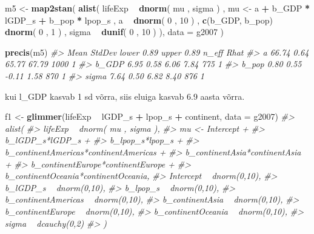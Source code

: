 \documentclass[]{book}
\newenvironment{Shaded}{\begin{snugshade}}{\end{snugshade}}
\newcommand{\KeywordTok}[1]{\textcolor[rgb]{0.13,0.29,0.53}{\textbf{#1}}}
\newcommand{\DataTypeTok}[1]{\textcolor[rgb]{0.13,0.29,0.53}{#1}}
\newcommand{\DecValTok}[1]{\textcolor[rgb]{0.00,0.00,0.81}{#1}}
\newcommand{\StringTok}[1]{\textcolor[rgb]{0.31,0.60,0.02}{#1}}
\newcommand{\CommentTok}[1]{\textcolor[rgb]{0.56,0.35,0.01}{\textit{#1}}}
\newcommand{\OperatorTok}[1]{\textcolor[rgb]{0.81,0.36,0.00}{\textbf{#1}}}
\newcommand{\NormalTok}[1]{#1}
\begin{document}
\begin{Shaded}
\begin{Highlighting}[]
\NormalTok{m5 <-}\StringTok{ }\KeywordTok{map2stan}\NormalTok{(}
    \KeywordTok{alist}\NormalTok{(}
\NormalTok{        lifeExp }\OperatorTok{~}\StringTok{ }\KeywordTok{dnorm}\NormalTok{( mu , sigma ) ,}
\NormalTok{        mu <-}\StringTok{ }\NormalTok{a }\OperatorTok{+}\StringTok{ }\NormalTok{b_GDP }\OperatorTok{*}\StringTok{ }\NormalTok{lGDP_s }\OperatorTok{+}\StringTok{ }\NormalTok{b_pop }\OperatorTok{*}\StringTok{ }\NormalTok{lpop_s ,}
\NormalTok{        a }\OperatorTok{~}\StringTok{ }\KeywordTok{dnorm}\NormalTok{( }\DecValTok{0}\NormalTok{ , }\DecValTok{10}\NormalTok{ ) ,}
        \KeywordTok{c}\NormalTok{(b_GDP, b_pop) }\OperatorTok{~}\StringTok{ }\KeywordTok{dnorm}\NormalTok{( }\DecValTok{0}\NormalTok{ , }\DecValTok{1}\NormalTok{ ) ,}
\NormalTok{        sigma }\OperatorTok{~}\StringTok{ }\KeywordTok{dunif}\NormalTok{( }\DecValTok{0}\NormalTok{ , }\DecValTok{10}\NormalTok{ )}
\NormalTok{), }\DataTypeTok{data =}\NormalTok{ g2007 )}
\end{Highlighting}
\end{Shaded}

\begin{Shaded}
\begin{Highlighting}[]
\KeywordTok{precis}\NormalTok{(m5)}
\CommentTok{#>        Mean StdDev lower 0.89 upper 0.89 n_eff Rhat}
\CommentTok{#> a     66.74   0.64      65.77      67.79  1000    1}
\CommentTok{#> b_GDP  6.95   0.58       6.06       7.84   775    1}
\CommentTok{#> b_pop  0.80   0.55      -0.11       1.58   870    1}
\CommentTok{#> sigma  7.64   0.50       6.82       8.40   876    1}
\end{Highlighting}
\end{Shaded}

kui l\_GDP kasvab 1 sd võrra, siis eluiga kasvab 6.9 aasta võrra.

\begin{Shaded}
\begin{Highlighting}[]
\NormalTok{f1 <-}\StringTok{ }\KeywordTok{glimmer}\NormalTok{(lifeExp }\OperatorTok{~}\StringTok{ }\NormalTok{lGDP_s }\OperatorTok{+}\StringTok{ }\NormalTok{lpop_s }\OperatorTok{+}\StringTok{ }\NormalTok{continent, }\DataTypeTok{data =}\NormalTok{ g2007)}
\CommentTok{#> alist(}
\CommentTok{#>     lifeExp ~ dnorm( mu , sigma ),}
\CommentTok{#>     mu <- Intercept +}
\CommentTok{#>         b_lGDP_s*lGDP_s +}
\CommentTok{#>         b_lpop_s*lpop_s +}
\CommentTok{#>         b_continentAmericas*continentAmericas +}
\CommentTok{#>         b_continentAsia*continentAsia +}
\CommentTok{#>         b_continentEurope*continentEurope +}
\CommentTok{#>         b_continentOceania*continentOceania,}
\CommentTok{#>     Intercept ~ dnorm(0,10),}
\CommentTok{#>     b_lGDP_s ~ dnorm(0,10),}
\CommentTok{#>     b_lpop_s ~ dnorm(0,10),}
\CommentTok{#>     b_continentAmericas ~ dnorm(0,10),}
\CommentTok{#>     b_continentAsia ~ dnorm(0,10),}
\CommentTok{#>     b_continentEurope ~ dnorm(0,10),}
\CommentTok{#>     b_continentOceania ~ dnorm(0,10),}
\CommentTok{#>     sigma ~ dcauchy(0,2)}
\CommentTok{#> )}
\end{Highlighting}
\end{Shaded}
\end{document}
